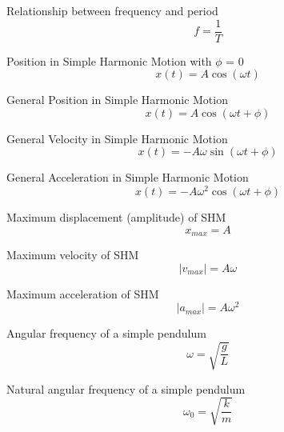 \documentclass[12pt, letterpaper, twoside]{article}
\begin{document}
Relationship between frequency and period
$$ f = \frac{1}{T} $$

Position in Simple Harmonic Motion with $\phi$ = 0
$$ x(t) = A \cos (\omega t) $$


General Position in Simple Harmonic Motion
$$ x(t)  = A \cos (\omega t + \phi) $$


General Velocity in Simple Harmonic Motion
$$ x(t)  = -A \omega \sin (\omega t + \phi) $$


General Acceleration in Simple Harmonic Motion
$$ x(t)  = -A \omega^2 \cos (\omega t + \phi) $$


Maximum displacement (amplitude) of SHM
$$ x_{max} = A $$


Maximum velocity of SHM
$$ |v_{max}| = A \omega $$


Maximum acceleration of SHM
$$ |a_{max}| = A \omega^2 $$



Angular frequency of a simple pendulum
$$ \omega = \sqrt{\frac{g}{L}} $$



Natural angular frequency of a simple pendulum
$$ \omega_0 = \sqrt{\frac{k}{m}} $$











\newpage
\end{document}
